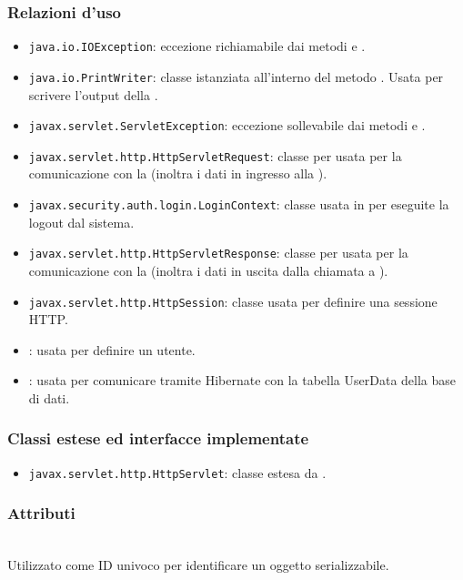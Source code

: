 \subsubsection*{Relazioni d'uso}
\begin{itemize}
	\item \texttt{java.io.IOException}: eccezione richiamabile dai metodi  e .
	\item \texttt{java.io.PrintWriter}: classe istanziata all'interno del metodo . Usata per scrivere l'output della .
	\item \texttt{javax.servlet.ServletException}: eccezione sollevabile dai metodi  e .
	\item \texttt{javax.servlet.http.HttpServletRequest}:  classe per usata per la comunicazione con la  (inoltra i dati in ingresso alla ).
	\item \texttt{javax.security.auth.login.LoginContext}: classe usata in  per eseguite la logout dal sistema.
	\item \texttt{javax.servlet.http.HttpServletResponse}: classe per usata per la comunicazione con la  (inoltra i dati in uscita dalla chiamata a ).
	\item \texttt{javax.servlet.http.HttpSession}: classe usata per definire una sessione HTTP.
	\item {}: usata per definire un utente.
	\item {}: usata per comunicare tramite Hibernate con la tabella UserData della base di dati.
\end{itemize}

\subsubsection*{Classi estese ed interfacce implementate}
\begin{itemize}
	\item \texttt{javax.servlet.http.HttpServlet}: classe estesa da .
\end{itemize}

\subsubsection*{Attributi}
\begin{description}
  \item{}\\
  Utilizzato come ID univoco per identificare un oggetto serializzabile.
\end{description}

